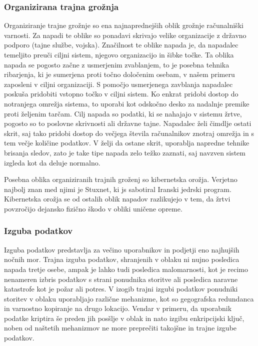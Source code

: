 \documentclass[12pt,a4paper,openany]{book}
\begin{document}
\subsubsection{Organizirana trajna grožnja}
Organiziranje trajne grožnje so ena najnaprednejših oblik grožnje računalniški varnosti. Za napadi te oblike so ponadavi skrivajo velike organizacije z državno podporo (tajne službe, vojska). Značilnost te oblike napada je, da napadalec temeljito preuči ciljni sistem, njegovo organizacijo in šibke točke. Ta oblika napada se pogosto začne z usmerjenim zvablanjem, to je posebna tehnika ribarjenja, ki je sumerjena proti točno določenim osebam, v našem primeru zaposleni v ciljni organizaciji. S pomočjo usmerjenega zavblanja napadalec poskuša pridobiti vstopno točko v ciljni sistem. Ko enkrat pridobi dostop do notranjega omrežja sistema, to uporabi kot odskočno desko za nadalnje premike proti željenim tarčam. Cilj napada so podatki, ki se nahajajo v sistemu žrtve, pogosto so to poslovne skrivnosti ali državne tajne. Napadalec želi čimdlje ostati skrit, saj tako pridobi dostop do večjega števila računalnikov znotraj omrežja in s tem večje količine podatkov. V želji da ostane skrit, uporablja napredne tehnike brisanja sledov, zato je take tipe napada zelo težko zaznati, saj navzven sistem izgleda kot da deluje normalno.

Posebna oblika organiziranih trajnih groženj so kibernetska orožja. Verjetno najbolj znan med njimi je Stuxnet, ki js sabotiral Iranski jedrski program. Kibernetska orožja se od ostalih oblik napadov razlikujejo v tem, da žrtvi povzročijo dejansko fizično škodo v obliki uničene opreme.

\subsubsection{Izguba podatkov}
Izguba podatkov predstavlja za večino uporabnikov in podjetji eno najhujših nočnih mor. Trajna izguba podatkov, shranjenih v oblaku ni nujno posledica napada tretje osebe, ampak je lahko tudi posledica malomarnosti, kot je recimo nenameren izbris podatkov s strani ponudnika storitve ali posledica naravne katastrofe kot je požar ali potres. V izogib trajni izgubi podatkov ponudniki storitev v oblaku uporabljajo različne mehanizme, kot so gegografska redundanca in varnostno kopiranje na drugo lokacijo. Vendar v primeru, da uporabnik podatke kriptira še preden jih posšlje v oblak in nato izgibu enkripcijski ključ, noben od naštetih mehanizmov ne more preprečiti takojšne in trajne izgube podatkov.
\end{document}
